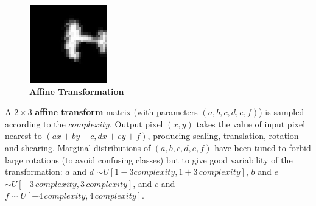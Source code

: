 \documentclass{article} %
\begin{document}
\begin{minipage}[h]{\linewidth}
\begin{figure}
\begin{center}
\vspace*{-5mm}
\includegraphics[scale=.4]{images/Affine_only.png}\\
{\small {\bf Affine \mbox{Transformation}}}
\end{center}
\end{figure}
A $2 \times 3$ {\bf affine transform} matrix (with
parameters $(a,b,c,d,e,f)$) is sampled according to the $complexity$.
Output pixel $(x,y)$ takes the value of input pixel
nearest to $(ax+by+c,dx+ey+f)$,
producing scaling, translation, rotation and shearing.
Marginal distributions of $(a,b,c,d,e,f)$ have been tuned to
forbid large rotations (to avoid confusing classes) but to give good
variability of the transformation: $a$ and $d$ $\sim U[1-3
complexity,1+3\,complexity]$, $b$ and $e$ $\sim U[-3 \,complexity,3\,
complexity]$, and $c$ and $f \sim U[-4 \,complexity, 4 \,
complexity]$.\\
\end{minipage}
\vspace*{3mm}

\vspace*{-4.5mm}
\end{document}
